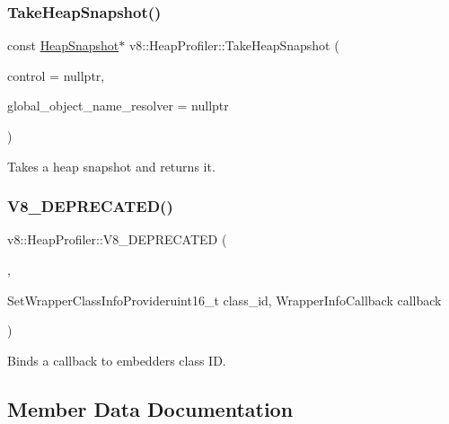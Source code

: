 \subsubsection{\texorpdfstring{Take\+Heap\+Snapshot()}{TakeHeapSnapshot()}}
{\footnotesize\ttfamily const \mbox{\hyperlink{classv8_1_1HeapSnapshot}{Heap\+Snapshot}}$\ast$ v8\+::\+Heap\+Profiler\+::\+Take\+Heap\+Snapshot (\begin{DoxyParamCaption}\item[{\mbox{\hyperlink{classv8_1_1ActivityControl}{Activity\+Control}} $\ast$}]{control = {\ttfamily nullptr},  }\item[{\mbox{\hyperlink{classv8_1_1HeapProfiler_1_1ObjectNameResolver}{Object\+Name\+Resolver}} $\ast$}]{global\+\_\+object\+\_\+name\+\_\+resolver = {\ttfamily nullptr} }\end{DoxyParamCaption})}

Takes a heap snapshot and returns it. \mbox{\label{classv8_1_1HeapProfiler_af41ccd8baea0da8d701e565b7b2e8eab}} 
\subsubsection{\texorpdfstring{V8\+\_\+\+D\+E\+P\+R\+E\+C\+A\+T\+E\+D()}{V8\_DEPRECATED()}}
{\footnotesize\ttfamily v8\+::\+Heap\+Profiler\+::\+V8\+\_\+\+D\+E\+P\+R\+E\+C\+A\+T\+ED (\begin{DoxyParamCaption}\item[{\char`\"{}Use Add\+Build\+Embedder\+Graph\+Callback to provide info about embedder nodes\char`\"{}}]{,  }\item[{void }]{Set\+Wrapper\+Class\+Info\+Provideruint16\+\_\+t class\+\_\+id, Wrapper\+Info\+Callback callback }\end{DoxyParamCaption})}

Binds a callback to embedder\textquotesingle{}s class ID. 

\subsection{Member Data Documentation}
\mbox{\label{classv8_1_1HeapProfiler_a272c9af3ea5cd90a2737af3d22a7eb78}} 
